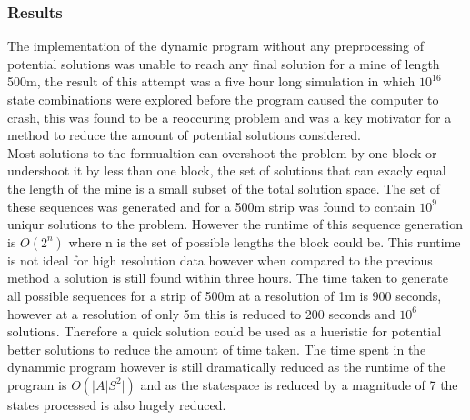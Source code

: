 \subsubsection{Results}
The implementation of the dynamic program without any preprocessing of potential solutions was unable to reach any final solution for a mine of length 500m, the result of this attempt was a five hour long simulation in which $10^16$ state combinations were explored before the program caused the computer to crash, this was found to be a reoccuring problem and was a key motivator for a method to reduce the amount of potential solutions considered. \\
Most solutions to the formualtion can overshoot the problem by one block or undershoot it by less than one block, the set of solutions that can exacly equal the length of the mine is a small subset of the total solution space. The set of these sequences was generated and for a 500m strip was found to contain $10^9$ uniqur solutions to the problem. However the runtime of this sequence generation is $O(2^n)$ where n is the set of possible lengths the block could be. This runtime is not ideal for high resolution data however when compared to the previous method a solution is still found within three hours. The time taken to generate all possible sequences for a strip of 500m at a resolution of 1m is 900 seconds, however at a resolution of only 5m this is reduced to 200 seconds and $10^6$ solutions. Therefore a quick solution could be used as a hueristic for potential better solutions to reduce the amount of time taken. The time spent in the dynammic program however is still dramatically reduced as the runtime of the program is $O(|A|S^2|)$ and as the statespace is reduced by a magnitude of 7 the states processed is also hugely reduced. 




